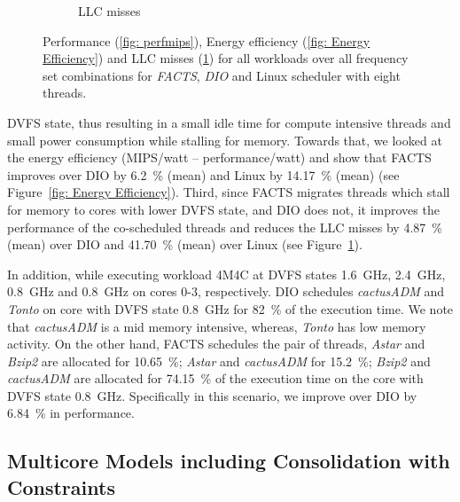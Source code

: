 \begin{figure}
\begin{subfigure}{0.5\textwidth}
        \caption{LLC misses}
        \label{fig: LLC}
    \end{subfigure}
    \caption[Performance evaluation for FACTS against DIO and Linux]{ Performance (\ref{fig: perfmips}), Energy efficiency (\ref{fig: Energy Efficiency}) and LLC misses (\ref{fig: LLC}) for all workloads over all frequency set combinations for \textit{FACTS}, \textit{DIO} and Linux scheduler with eight threads.}
    \label{fig: FACTS result}
    \vspace{2mm}
\end{figure}


\noindent DVFS state, thus resulting in a small idle time for compute intensive threads and small
power consumption while stalling for memory. Towards that, we looked at the energy
efficiency (MIPS/watt -- performance/watt) and show that FACTS improves over DIO by
\SI{6.2}{\percent} (mean) and Linux by \SI{14.17}{\percent} (mean) (see Figure~\ref{fig:
Energy Efficiency}). Third, since FACTS migrates threads which stall for memory to cores
with lower DVFS state, and DIO does not, it improves the performance of the co-scheduled
threads and reduces the LLC misses by \SI{4.87}{\percent} (mean) over DIO and
\SI{41.70}{\percent} (mean) over Linux (see Figure~\ref{fig: LLC}).



In addition, while executing workload 4M4C at DVFS states \SI{1.6}{\giga\hertz},
\SI{2.4}{\giga\hertz}, \SI{0.8}{\giga\hertz} and \SI{0.8}{\giga\hertz} on cores 0-3,
respectively.  DIO schedules \emph{cactusADM} and \emph{Tonto} on core with DVFS state
\SI{0.8}{\giga\hertz} for \SI{82}{\percent} of the execution time. We note that
\emph{cactusADM} is a mid memory intensive, whereas, \emph{Tonto} has low memory activity.
On the other hand, FACTS schedules the pair of threads, \emph{Astar} and \emph{Bzip2} are
allocated for \SI{10.65}{\percent}; \emph{Astar} and \emph{cactusADM} for
\SI{15.2}{\percent}; \emph{Bzip2} and \emph{cactusADM} are allocated for
\SI{74.15}{\percent} of the execution time on the core with DVFS state
\SI{0.8}{\giga\hertz}.  Specifically in this scenario, we improve over DIO by
\SI{6.84}{\percent} in performance.


\subsection{Multicore Models including Consolidation with Constraints}%
\label{subsec: evalREPP-C}

